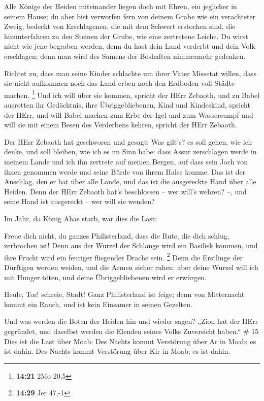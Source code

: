  Alle Könige der Heiden miteinander liegen doch mit Ehren,
ein jeglicher in seinem Hause;  du aber bist verworfen fern
von deinem Grabe wie ein verachteter Zweig, bedeckt von Erschlagenen,
die mit dem Schwert erstochen sind, die hinunterfahren zu den Steinen
der Grube, wie eine zertretene Leiche.  Du wirst nicht wie
jene begraben werden, denn du hast dein Land verderbt und dein Volk
erschlagen; denn man wird des Samens der Boshaften nimmermehr gedenken.

 Richtet zu, dass man seine Kinder schlachte um ihrer Väter
Missetat willen, dass sie nicht aufkommen noch das Land erben noch den
Erdboden voll Städte machen. \footnote{\textbf{14:21} 2Mo 20,5}
 Und ich will über sie kommen, spricht der HErr Zebaoth,
und zu Babel ausrotten ihr Gedächtnis, ihre Übriggebliebenen, Kind und
Kindeskind, spricht der HErr,  und will Babel machen zum
Erbe der Igel und zum Wassersumpf und will sie mit einem Besen des
Verderbens kehren, spricht der HErr Zebaoth.

 Der HErr Zebaoth hat geschworen und gesagt: Was gilt's? es
soll gehen, wie ich denke, und soll bleiben, wie ich es im Sinn habe:
 dass Assur zerschlagen werde in meinem Lande und ich ihn
zertrete auf meinen Bergen, auf dass sein Joch von ihnen genommen werde
und seine Bürde von ihrem Halse komme.  Das ist der
Anschlag, den er hat über alle Lande, und das ist die ausgereckte Hand
über alle Heiden.  Denn der HErr Zebaoth hat's beschlossen
-- wer will's wehren? --, und seine Hand ist ausgereckt -- wer will sie
wenden?

 Im Jahr, da König Ahas starb, war dies die Last:

 Freue dich nicht, du ganzes Philisterland, dass die Rute,
die dich schlug, zerbrochen ist! Denn aus der Wurzel der Schlange wird
ein Basilisk kommen, und ihre Frucht wird ein feuriger fliegender Drache
sein. \footnote{\textbf{14:29} Jer 47,-1}  Denn die
Erstlinge der Dürftigen werden weiden, und die Armen sicher ruhen; aber
deine Wurzel will ich mit Hunger töten, und deine Übriggebliebenen wird
er erwürgen.

 Heule, Tor! schreie, Stadt! Ganz Philisterland ist feige;
denn von Mitternacht kommt ein Rauch, und ist kein Einsamer in seinen
Gezelten.

 Und was werden die Boten der Heiden hin und wieder sagen?
„Zion hat der HErr gegründet, und daselbst werden die Elenden seines
Volks Zuversicht haben.`` \# 15  Dies ist die Last über
Moab: Des Nachts kommt Verstörung über Ar in Moab; es ist dahin. Des
Nachts kommt Verstörung über Kir in Moab; es ist dahin.

